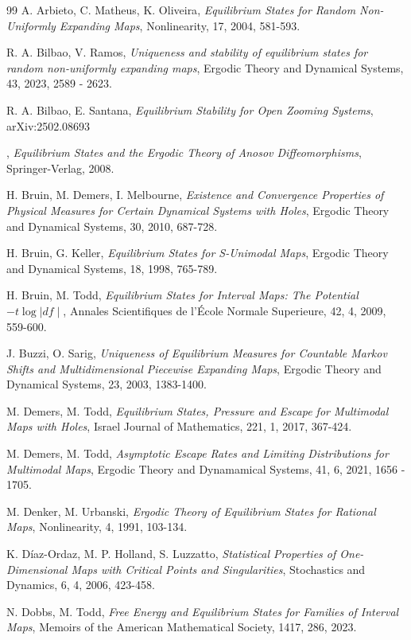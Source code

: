 \documentclass[12pt,a4paper]{amsart}
\theoremstyle{plain}
\begin{document}
\begin{thebibliography}{99}
	 {\sc A. Arbieto, C. Matheus, K. Oliveira}, {\it Equilibrium States for Random Non-Uniformly Expanding Maps}, Nonlinearity, 17, 2004, 581-593. 
	
	 {\sc R. A. Bilbao, V. Ramos}, {\it Uniqueness and stability of equilibrium states for random non-uniformly expanding maps}, Ergodic Theory and Dynamical Systems, 43, 2023,  2589 - 2623.
	
	 {\sc R. A. Bilbao, E. Santana}, {\it Equilibrium Stability for Open Zooming Systems}, arXiv:2502.08693
	
	, {\it Equilibrium States and the Ergodic Theory of Anosov Diffeomorphisms}, Springer-Verlag, 2008.
	
	 {\sc H. Bruin, M. Demers, I. Melbourne}, {\it Existence and Convergence Properties of Physical Measures for Certain Dynamical Systems with Holes}, Ergodic Theory and Dynamical Systems, 30, 2010, 687-728.
	
	 {\sc H. Bruin, G. Keller}, {\it Equilibrium States for S-Unimodal Maps}, Ergodic Theory and Dynamical Systems, 18, 1998, 765-789.
	
	 {\sc H. Bruin, M. Todd}, {\it Equilibrium States for Interval Maps: The Potential $-t \log |df \mid$}, Annales Scientifiques de l'\'Ecole Normale Superieure, 42, 4, 2009, 559-600.
	
	 {\sc J. Buzzi, O. Sarig}, {\it Uniqueness of Equilibrium Measures for Countable Markov Shifts and Multidimensional Piecewise Expanding Maps}, Ergodic Theory and Dynamical Systems, 23, 2003, 1383-1400.
	
	 {\sc M. Demers, M. Todd}, {\it Equilibrium States, Pressure and Escape for Multimodal Maps with Holes}, Israel Journal of Mathematics, 221, 1, 2017, 367-424.
	
	 {\sc M. Demers, M. Todd}, {\it Asymptotic Escape Rates and Limiting
		Distributions for Multimodal Maps}, Ergodic Theory and Dynamamical Systems, 41, 6, 2021, 1656 - 1705.
	
	 {\sc M. Denker, M. Urbanski}, {\it Ergodic Theory of Equilibrium States for Rational Maps}, Nonlinearity, 4, 1991, 103-134.
	
	 {\sc K. D\'iaz-Ordaz, M. P. Holland, S. Luzzatto}, {\it Statistical Properties of One-Dimensional Maps with Critical Points and Singularities}, Stochastics and Dynamics, 6, 4, 2006, 423-458.
	
	 {\sc N. Dobbs, M. Todd}, {\it Free Energy and Equilibrium States for Families of
		Interval Maps},  Memoirs of the American Mathematical Society, 1417, 286, 2023.
	

\end{thebibliography}
\end{document}
